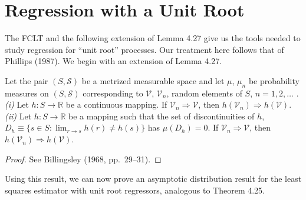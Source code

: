 \section{Regression with a Unit Root}\label{sec:unit-root}

The FCLT and the following extension of Lemma 4.27 give us the tools needed to study regression for ``unit root'' processes. Our treatment here follows that of Phillips (1987). We begin with an extension of Lemma 4.27.

\begin{theorem}\label{thm:cmt}
Let the pair $(S, \mathcal{S})$ be a metrized measurable space and let $\mu$, $\mu_n$ be probability measures on $(S, \mathcal{S})$ corresponding to $\mathcal{V}$, $\mathcal{V}_n$, random elements of $S$, $n = 1, 2, \ldots$ . \emph{(i)} Let $h : S \to \mathbb{R}$ be a continuous mapping. If $\mathcal{V}_n \Rightarrow \mathcal{V}$, then $h(\mathcal{V}_n) \Rightarrow h(\mathcal{V})$. \emph{(ii)} Let $h : S \to \mathbb{R}$ be a mapping such that the set of discontinuities of $h$, $D_h \equiv \{s \in S : \lim_{r \to s} h(r) \neq h(s)\}$ has $\mu(D_h) = 0$. If $\mathcal{V}_n \Rightarrow \mathcal{V}$, then $h(\mathcal{V}_n) \Rightarrow h(\mathcal{V})$.
\end{theorem}

\begin{proof}
See Billingsley (1968, pp.\ 29--31).
\end{proof}

Using this result, we can now prove an asymptotic distribution result for the least squares estimator with unit root regressors, analogous to Theorem 4.25.

